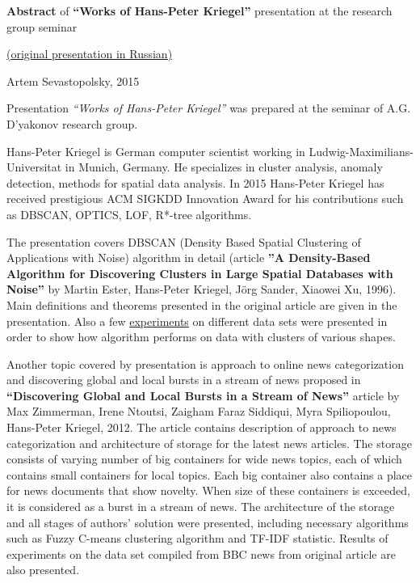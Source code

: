 \documentclass[11pt]{article}
\begin{document}
	{\large {\bf Abstract} of {\bf``Works of Hans-Peter Kriegel''} presentation at the research group seminar
	
	 \href{http://www.machinelearning.ru/wiki/images/4/4e/Sevastopolsky_-_report_H-P_Kriegel.pdf}{(original presentation in Russian)}
	\newline
	
	{Artem Sevastopolsky, 2015}}
	\newline
	\newline
	\newline
	\par
	Presentation \emph{``Works of Hans-Peter Kriegel''} was prepared at the seminar of A.G. D'yakonov research group. \newline
	
	Hans-Peter Kriegel is German computer scientist working in Ludwig-Maximilians-Universitat in Munich, Germany. He specializes in cluster analysis, anomaly detection, methods for spatial data analysis. In 2015 Hans-Peter Kriegel has received prestigious ACM SIGKDD Innovation Award for his contributions such as DBSCAN, OPTICS, LOF, R*-tree algorithms.  \newline
	
	The presentation covers DBSCAN (Density Based Spatial Clustering of Applications with Noise) algorithm in detail (article  {\bf ''A Density-Based Algorithm for Discovering Clusters in Large Spatial Databases with Noise''} by Martin Ester, Hans-Peter Kriegel, Jörg Sander, Xiaowei Xu, 1996). Main definitions and theorems presented in the original article are given in the presentation. Also a few \href{http://www.naftaliharris.com/blog/visualizing-dbscan-clustering/}{experiments} on different data sets were presented in order to show how algorithm performs on data with clusters of various shapes. \newline
	
	Another topic covered by presentation is approach to online news categorization and discovering global and local bursts in a stream of news proposed in {\bf ``Discovering Global and Local Bursts in a Stream of News''} article by Max Zimmerman, Irene Ntoutsi, Zaigham Faraz Siddiqui, Myra Spiliopoulou, Hans-Peter Kriegel, 2012. The article contains description of approach to news categorization and architecture of storage for the latest news articles. The storage consists of varying number of big containers for wide news topics, each of which contains small containers for local topics. Each big container also contains a place for news documents that show novelty. When size of these containers is exceeded, it is considered as a burst in a stream of news. The architecture of the storage and all stages of authors' solution were presented, including necessary algorithms such as Fuzzy C-means clustering algorithm and TF-IDF statistic. Results of experiments on the data set compiled from BBC news from original article are also presented.
\end{document}

